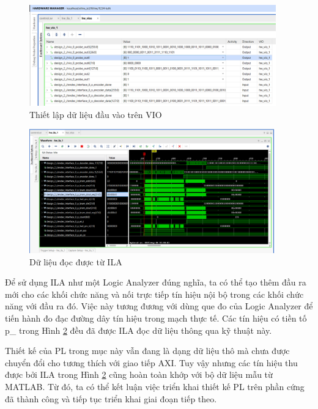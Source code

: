 \documentclass[../DoAn.tex]{subfiles}
\begin{document}
\begin{figure}[H]
    \centering
    \includegraphics[width=0.95\textwidth, height=0.33\textheight, keepaspectratio]{Hinhve/Chuong 4/VIO.png}
    \caption{Thiết lập dữ liệu đầu vào trên VIO}
    \label{fig:Thiết lập dữ liệu đầu vào trên VIO}
\end{figure}

\begin{figure}[H]
    \centering
    \includegraphics[width=0.95\textwidth, height=0.33\textheight, keepaspectratio]{Hinhve/Chuong 4/ILA raw data.png}
    \caption{Dữ liệu đọc được từ ILA}
    \label{figure:Dữ liệu đọc được từ ILA}
\end{figure}

Để sử dụng ILA như một Logic Analyzer đúng nghĩa, ta có thể tạo thêm đầu ra mới cho các khối chức năng và nối trực tiếp tín hiệu nội bộ trong các khối chức năng với đầu ra đó. Việc này tương đương với dùng que đo của Logic Analyzer để tiến hành đo đạc đường dây tín hiệu trong mạch thực tế. Các tín hiệu có tiền tố p\_ trong Hình \ref{figure:Dữ liệu đọc được từ ILA} đều đã được ILA đọc dữ liệu thông qua kỹ thuật này.

Thiết kế của PL trong mục này vẫn đang là dạng dữ liệu thô mà chưa được chuyển đổi cho tương thích với giao tiếp AXI. Tuy vậy nhưng các tín hiệu thu được bởi ILA trong Hình \ref{figure:Dữ liệu đọc được từ ILA} cũng hoàn toàn khớp với bộ dữ liệu mẫu từ MATLAB. Từ đó, ta có thể kết luận việc triển khai thiết kế PL trên phần cứng đã thành công và tiếp tục triển khai giai đoạn tiếp theo.
\end{document}
